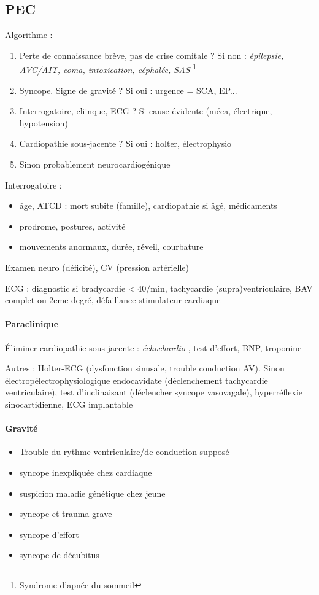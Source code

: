 \subsection{PEC}
Algorithme :
\begin{enumerate}
  \item Perte de connaissance brève, pas de crise comitale ? Si non : \textit{épilepsie,
    AVC/AIT, coma, intoxication, céphalée, SAS} \footnote{Syndrome d'apnée du
    sommeil} \faHandStopO
  \item Syncope. Signe de gravité ? Si oui : urgence = SCA, EP... \faHandStopO
  \item Interrogatoire, cliinque, ECG ? Si cause évidente (méca, électrique,
    hypotension) \faHandStopO
  \item Cardiopathie sous-jacente ? Si oui : holter, électrophysio
  \item Sinon probablement neurocardiogénique
\end{enumerate}

Interrogatoire :
\begin{itemize}
  \item âge, ATCD : mort subite (famille), cardiopathie si âgé, médicaments
  \item prodrome, postures, activité
  \item mouvements anormaux, durée, réveil, courbature
\end{itemize}
Examen neuro (déficité), CV (pression artérielle)

ECG : diagnostic si bradycardie < 40/min, tachycardie (supra)ventriculaire, BAV
complet ou 2eme degré, défaillance stimulateur cardiaque

\paragraph{Paraclinique}
Éliminer cardiopathie sous-jacente : \textit{échochardio} , test d'effort, BNP,
troponine

Autres : Holter-ECG (dysfonction sinusale, trouble conduction AV). Sinon
électropélectrophysiologique endocavidate (déclenchement tachycardie
ventriculaire), test d'inclinaisant (déclencher syncope vasovagale),
hyperréflexie sinocartidienne, ECG implantable

\paragraph{Gravité}
\begin{itemize}
  \item Trouble du rythme ventriculaire/de conduction supposé
  \item syncope inexpliquée chez cardiaque
  \item suspicion maladie génétique chez jeune
  \item syncope et trauma grave
  \item syncope d'effort
  \item syncope de décubitus
\end{itemize}

